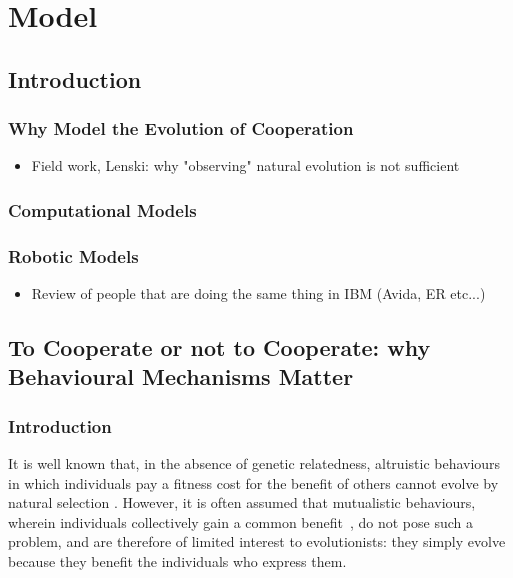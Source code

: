 \chapter{Model}

\minitoc[n] %

\section{Introduction}

  \subsection{Why Model the Evolution of Cooperation}
    \begin{itemize}
      \item{Field work, Lenski: why "observing" natural evolution is not sufficient}
    \end{itemize}

  \subsection{Computational Models}

  \subsection{Robotic Models}
    \begin{itemize}
      \item{Review of people that are doing the same thing in IBM (Avida, ER etc...)}
    \end{itemize}

\section{To Cooperate or not to Cooperate: why Behavioural Mechanisms Matter}
  \subsection{Introduction}
    It is well known that, in the absence of genetic relatedness, altruistic behaviours in which individuals pay a fitness cost for the benefit of others cannot evolve by natural selection \cite{Hamilton1964,West2007a}. However, it is often assumed that mutualistic behaviours, wherein individuals collectively gain a common benefit~\cite{Leimar2003, Leimar2010}, do not pose such a problem, and are therefore of limited interest to evolutionists: they simply evolve because they benefit the individuals who express them.

